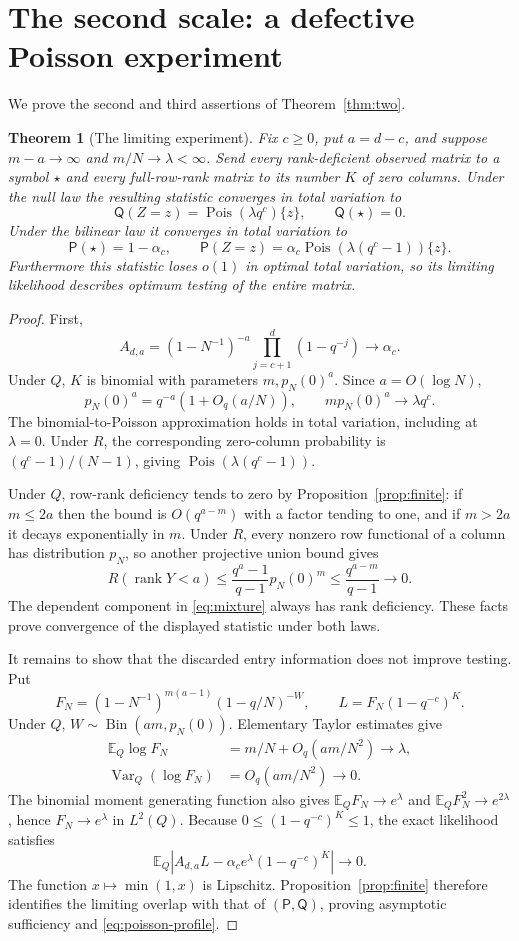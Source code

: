 \documentclass[11pt]{article}
\newtheorem{theorem}{Theorem}[section]
\theoremstyle{remark}\newtheorem{remark}[theorem]{Remark}
\newcommand{\E}{\mathbb E}
\newcommand{\rank}{\operatorname{rank}}
\newcommand{\Poi}{\operatorname{Pois}}
\newcommand{\Bin}{\operatorname{Bin}}
\begin{document}
\section{The second scale: a defective Poisson experiment}
We prove the second and third assertions of Theorem~\ref{thm:two}.

\begin{theorem}[The limiting experiment]\label{thm:experiment}
Fix $c\ge0$, put $a=d-c$, and suppose $m-a\to\infty$ and $m/N\to\lambda<\infty$. Send every rank-deficient observed matrix to a symbol $\star$ and every full-row-rank matrix to its number $K$ of zero columns. Under the null law the resulting statistic converges in total variation to
\[
 \mathsf Q(Z=z)=\Poi(\lambda q^c)\{z\},\qquad \mathsf Q(\star)=0.
\]
Under the bilinear law it converges in total variation to
\[
 \mathsf P(\star)=1-\alpha_c,\qquad
 \mathsf P(Z=z)=\alpha_c\Poi(\lambda(q^c-1))\{z\}.
\]
Furthermore this statistic loses $o(1)$ in optimal total variation, so its limiting likelihood describes optimum testing of the entire matrix.
\end{theorem}

\begin{proof}
First,
\[
 A_{d,a}=(1-N^{-1})^{-a}\prod_{j=c+1}^{d}(1-q^{-j})\longrightarrow\alpha_c.
\]
Under $Q$, $K$ is binomial with parameters $m,p_N(0)^a$. Since $a=O(\log N)$,
\[
 p_N(0)^a=q^{-a}(1+O_q(a/N)),\qquad
 mp_N(0)^a\longrightarrow\lambda q^c.
\]
The binomial-to-Poisson approximation holds in total variation, including at $\lambda=0$. Under $R$, the corresponding zero-column probability is $(q^c-1)/(N-1)$, giving $\Poi(\lambda(q^c-1))$.

Under $Q$, row-rank deficiency tends to zero by Proposition~\ref{prop:finite}: if $m\le2a$ then the bound is $O(q^{a-m})$ with a factor tending to one, and if $m>2a$ it decays exponentially in $m$. Under $R$, every nonzero row functional of a column has distribution $p_N$, so another projective union bound gives
\[
 R(\rank Y<a)\le\frac{q^a-1}{q-1}p_N(0)^m\le\frac{q^{a-m}}{q-1}\longrightarrow0.
\]
The dependent component in \eqref{eq:mixture} always has rank deficiency. These facts prove convergence of the displayed statistic under both laws.

It remains to show that the discarded entry information does not improve testing. Put
\[
 F_N=(1-N^{-1})^{m(a-1)}(1-q/N)^{-W},
 \qquad L=F_N(1-q^{-c})^K.
\]
Under $Q$, $W\sim\Bin(am,p_N(0))$. Elementary Taylor estimates give
\begin{align*}
 \E_Q\log F_N&=m/N+O_q(am/N^2)\longrightarrow\lambda,\\
 \operatorname{Var}_Q(\log F_N)&=O_q(am/N^2)\longrightarrow0.
\end{align*}
The binomial moment generating function also gives $\E_QF_N\to e^\lambda$ and $\E_QF_N^2\to e^{2\lambda}$, hence $F_N\to e^\lambda$ in $L^2(Q)$. Because $0\le(1-q^{-c})^K\le1$, the exact likelihood satisfies
\[
 \E_Q\left|A_{d,a}L-\alpha_c e^\lambda(1-q^{-c})^K\right|\longrightarrow0.
\]
The function $x\mapsto\min(1,x)$ is Lipschitz. Proposition~\ref{prop:finite} therefore identifies the limiting overlap with that of $(\mathsf P,\mathsf Q)$, proving asymptotic sufficiency and \eqref{eq:poisson-profile}.
\end{proof}
\end{document}
